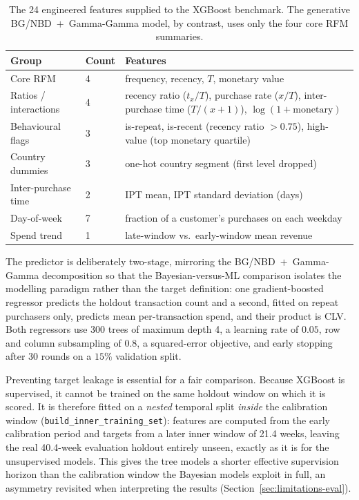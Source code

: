 \begin{table}[htbp]
  \centering
  \caption{The 24 engineered features supplied to the XGBoost benchmark. The generative BG/NBD~$+$~Gamma-Gamma model, by contrast, uses only the four core RFM summaries.}
  \label{tab:xgb-features}
  \begin{tabularx}{\linewidth}{@{}l l Y@{}}
    \toprule
    \textbf{Group} & \textbf{Count} & \textbf{Features} \\
    \midrule
    Core RFM & 4 & frequency, recency, $T$, monetary value \\
    \addlinespace
    Ratios / interactions & 4 & recency ratio ($t_x/T$), purchase rate ($x/T$), inter-purchase time ($T/(x{+}1)$), $\log(1{+}\text{monetary})$ \\
    \addlinespace
    Behavioural flags & 3 & is-repeat, is-recent (recency ratio $>0.75$), high-value (top monetary quartile) \\
    \addlinespace
    Country dummies & 3 & one-hot country segment (first level dropped) \\
    \addlinespace
    Inter-purchase time & 2 & IPT mean, IPT standard deviation (days) \\
    \addlinespace
    Day-of-week & 7 & fraction of a customer's purchases on each weekday \\
    \addlinespace
    Spend trend & 1 & late-window vs.\ early-window mean revenue \\
    \bottomrule
  \end{tabularx}
\end{table}

The predictor is deliberately two-stage, mirroring the BG/NBD~$+$~Gamma-Gamma decomposition so that the Bayesian-versus-ML comparison isolates the modelling paradigm rather than the target definition: one gradient-boosted regressor predicts the holdout transaction count and a second, fitted on repeat purchasers only, predicts mean per-transaction spend, and their product is CLV. Both regressors use 300 trees of maximum depth 4, a learning rate of $0.05$, row and column subsampling of $0.8$, a squared-error objective, and early stopping after 30 rounds on a $15\%$ validation split.

Preventing target leakage is essential for a fair comparison. Because XGBoost is supervised, it cannot be trained on the same holdout window on which it is scored. It is therefore fitted on a \emph{nested} temporal split \emph{inside} the calibration window (\texttt{build\_inner\_training\_set}): features are computed from the early calibration period and targets from a later inner window of \num{21.4} weeks, leaving the real \num{40.4}-week evaluation holdout entirely unseen, exactly as it is for the unsupervised models. This gives the tree models a shorter effective supervision horizon than the calibration window the Bayesian models exploit in full, an asymmetry revisited when interpreting the results (Section~\ref{sec:limitations-eval}).

